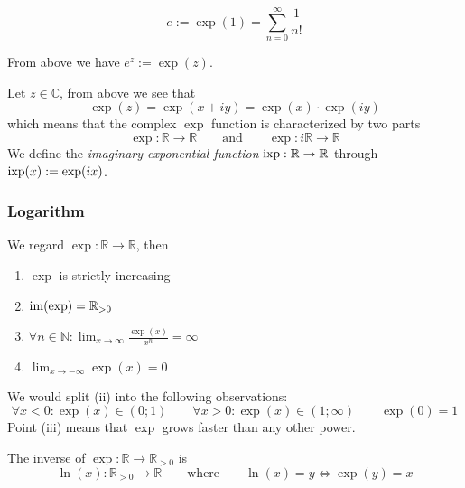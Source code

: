 \begin{definition}
   \[e := \exp(1) = \sum_{n=0}^\infty \frac{1}{n!}\]
\end{definition}
\begin{remark}[Notation]
   From above we have \(e^z := \exp(z)\).
\end{remark}

Let \(z \in \mathbb{C}\), from above we see that
\[\exp(z) = \exp(x + iy) = \exp(x) \cdot \exp(iy)\]
which means that the complex \(\exp\) function is characterized by two parts
\[\exp: \mathbb{R} \to \mathbb{R} \qquad\text{and}\qquad \exp: i\mathbb{R} \to \mathbb{R}\]
We define the \emph{imaginary exponential function} \(\operatorname{ixp}: \mathbb{R} \to \mathbb{R}\) through \(\operatorname{ixp}(x) := \exp(ix)\).

\subsubsection{Logarithm}
\begin{proposition}
   We regard \(\exp: \mathbb{R} \to \mathbb{R}\), then
   \begin{enumerate}[label=\roman*, align=Center]
      \item \(\exp\) is strictly increasing
      \item \(\operatorname{im}(\exp) = \mathbb{R}_{>0}\)
      \item \(\forall n \in \mathbb{N}: \lim_{x \to \infty} \frac{\exp(x)}{x^n} = \infty\)
      \item \(\lim_{x \to -\infty} \exp(x) = 0\)
   \end{enumerate}
\end{proposition}
\begin{remark}[Intuition]
   We would split (ii) into the following observations:
   \[\forall x < 0: \exp(x) \in (0; 1) \qquad \forall x > 0: \exp(x) \in (1; \infty) \qquad \exp(0) = 1\]
   Point (iii) means that \(\exp\) grows faster than any other power.
\end{remark}

\begin{definition}[Logarithm]
   The inverse of \(\exp: \mathbb{R} \to \mathbb{R}_{>0}\) is
   \[\ln(x): \mathbb{R}_{>0} \to \mathbb{R} \qquad\text{where}\qquad \ln(x) = y \iff \exp(y) = x\]
\end{definition}

